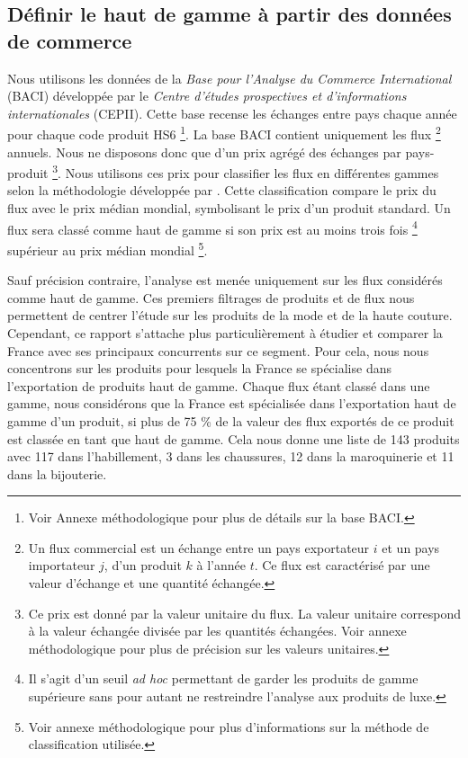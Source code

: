 \documentclass[french,10pt,a4paper]{article}
\begin{document}
\subsection{Définir le haut de gamme à partir des données de commerce}

Nous utilisons les données de la \textit{Base pour l'Analyse du Commerce International} (BACI) \citep{Gaulier2010} développée par le \textit{Centre d'études prospectives et d'informations internationales} (CEPII). Cette base recense les échanges entre pays chaque année pour chaque code produit HS6 \footnote{Voir Annexe méthodologique pour plus de détails sur la base BACI.}. La base BACI contient uniquement les flux \footnote{Un flux commercial est un échange entre un pays exportateur $i$ et un pays importateur $j$, d'un produit $k$ à l'année $t$. Ce flux est caractérisé par une valeur d'échange et une quantité échangée.} annuels. Nous ne disposons donc que d'un prix agrégé des échanges par pays-produit \footnote{Ce \og prix\fg{} est donné par la valeur unitaire du flux. La valeur unitaire correspond à la valeur échangée divisée par les quantités échangées. Voir annexe méthodologique pour plus de précision sur les valeurs unitaires.}. Nous utilisons ces prix pour classifier les flux en différentes gammes selon la méthodologie développée par \cite{Fontagne1997}. Cette classification compare le \og prix\fg{} du flux avec le \og prix\fg{} médian mondial, symbolisant le \og prix\fg{} d'un produit standard. Un flux sera classé comme haut de gamme si son \og prix\fg{} est au moins trois fois \footnote{Il s'agit d'un seuil \textit{ad hoc} permettant de garder les produits de gamme supérieure sans pour autant ne restreindre l'analyse aux produits de luxe.} supérieur au \og prix\fg{} médian mondial \footnote{Voir annexe méthodologique pour plus d'informations sur la méthode de classification utilisée.}.


\bigskip

Sauf précision contraire, l'analyse est menée uniquement sur les flux considérés comme haut de gamme. Ces premiers filtrages de produits et de flux nous permettent de centrer l'étude sur les produits de la mode et de la haute couture. Cependant, ce rapport s'attache plus particulièrement à étudier et comparer la France avec ses principaux concurrents sur ce segment. Pour cela, nous nous concentrons sur les produits pour lesquels la France se spécialise dans l'exportation de produits haut de gamme. Chaque flux étant classé dans une gamme, nous considérons que la France est spécialisée dans l'exportation haut de gamme d'un produit, si plus de 75 \% de la valeur des flux exportés de ce produit est classée en tant que haut de gamme. Cela nous donne une liste de 143 produits avec 117 dans l'habillement, 3 dans les chaussures, 12 dans la maroquinerie et 11 dans la bijouterie.
\end{document}
